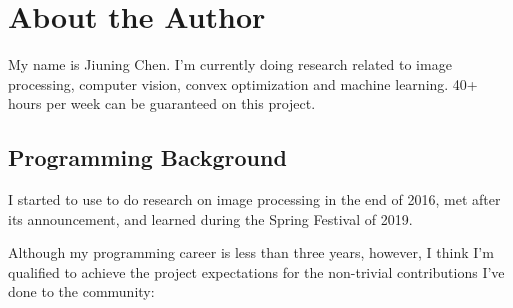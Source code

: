 
\section{About the Author}\label{sec:about_author}

My name is \textsf{Jiuning Chen}. I'm currently doing research related to image processing, computer vision, convex optimization and machine learning. 40+ hours per week can be guaranteed on this project.

\subsection*{Programming Background}

I started to use \langmatlab to do research on image processing in the end of 2016, met  \langjulia after its  announcement, and learned \langpython during the Spring Festival of 2019. \par

Although my programming career is less than three years, however, I think I'm qualified to achieve the project expectations for the non-trivial contributions I've done to the \langjulia{} community:

